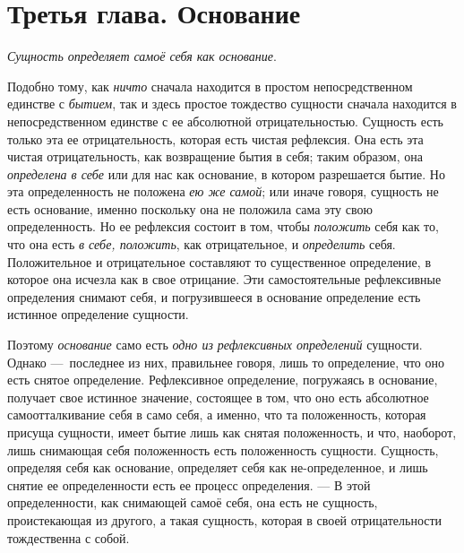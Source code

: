 \chapter[{\em Третья глава} Основание]{Третья глава. Основание}
{\em Сущность определяет самоё себя как основание}.

Подобно тому, как {\em ничто} сначала находится в
простом непосредственном единстве с {\em бытием}, так и
здесь простое тождество сущности сначала находится в непосредственном
единстве с ее абсолютной отрицательностью. Сущность есть только эта ее
отрицательность, которая есть чистая рефлексия. Она есть эта чистая
отрицательность, как возвращение бытия в себя; таким образом, она
{\em определена в себе} или для нас как основание, в
котором разрешается бытие. Но эта определенность не положена
{\em ею же самой}; или иначе говоря, сущность не есть
основание, именно поскольку она не положила сама эту свою определенность.
Но ее рефлексия состоит в том, чтобы {\em положить}
себя как то, что она есть {\em в себе, положить}, как
отрицательное, и {\em определить} себя. Положительное и
отрицательное составляют то существенное определение, в которое она исчезла
как в свое отрицание. Эти самостоятельные рефлексивные определения снимают
себя, и погрузившееся в основание определение есть истинное определение
сущности.

Поэтому {\em основание} само есть
{\em одно из рефлексивных определений} сущности. Однако
—~последнее из них, правильнее говоря, лишь то определение, что оно есть
снятое определение. Рефлексивное определение, погружаясь в основание,
получает свое истинное значение, состоящее в том, что оно есть абсолютное
самоотталкивание себя в само себя, а именно, что та положенность, которая
присуща сущности, имеет бытие лишь как снятая положенность, и что,
наоборот, лишь снимающая себя положенность есть положенность сущности.
Сущность, определяя себя как основание, определяет себя как
не-определенное, и лишь снятие ее определенности есть ее процесс
определения. — В этой определенности, как снимающей самоё себя, она есть не
сущность, проистекающая из другого, а такая сущность, которая в своей
отрицательности тождественна с собой.

